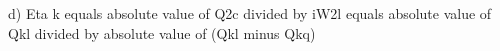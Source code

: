 d)  
Eta k equals absolute value of Q2c divided by iW2l equals absolute value of Qkl divided by absolute value of (Qkl minus Qkq)